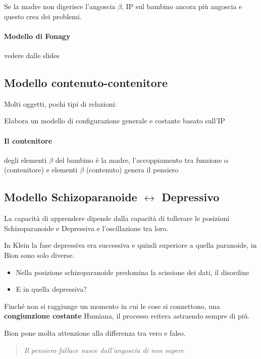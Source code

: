 \documentclass[12pt, a4paper]{article}
\begin{document}
Se la madre non digerisce l'angoscia $\beta$, IP sul bambino ancora pi\`u angoscia e questo crea dei problemi.

\paragraph{Modello di Fonagy} vedere dalle slides

\subsection{Modello contenuto-contenitore}

Molti oggetti, pochi tipi di relazioni:  

Elabora un modello di configurazione generale e costante basato sull'IP

\paragraph{Il contenitore} degli elementi $\beta$ del bambino \`e la madre, l'accoppiamento tra funzione $\alpha$ (contenitore) e elementi $\beta$ (contenuto) genera il pensiero

\subsection{Modello Schizoparanoide $\leftrightarrow$ Depressivo}

La capacit\`a di apprendere dipende dalla capacit\`a di tollerare le posizioni Schizoparanoide e Depressiva e l'oscillazione tra loro.

In Klein la fase depressiva era successiva e quindi superiore a quella paranoide, in Bion sono solo diverse.
\begin{itemize}
    \item Nella posizione schizoparanoide predomina la scissione dei dati, il disordine
    \item E in quella depressiva?
\end{itemize}

Finch\'e non si raggiunge un momento in cui le cose si connettono, una \textbf{congiunzione costante} Humiana, il processo reitera astraendo sempre di pi\`u.

Bion pone molta attenzione alla differenza tra vero e falso.

\smallskip
\begin{quote}\emph{Il pensiero fallace nasce dall'angoscia di non sapere}
\end{quote}
\end{document}
